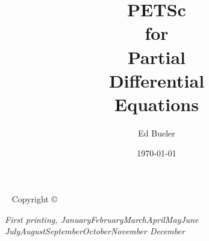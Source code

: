 \documentclass{tufte-book}
\title[PETSc for PDEs]{PETSc \\ for \\ Partial \\ Differential \\ Equations}
\author{Ed Bueler}
\date{\today}
\theoremstyle{definition}
\newcommand{\openepigraph}[2]{%
  \begin{fullwidth}
  \sffamily\large
  \begin{doublespace}
  \noindent\allcaps{#1}\\%
  \noindent \Large \allcaps{#2}%
  \end{doublespace}
  \end{fullwidth}
}
\newcommand{\monthyear}{%
  \ifcase\month\or January\or February\or March\or April\or May\or June\or
  July\or August\or September\or October\or November\or
  December\fi\space\number\year
}
\begin{document}
\begin{comment}
\newpage\thispagestyle{empty}
\openepigraph{%
\dots when there are disputes among persons, we can simply say: Let us calculate, without further ado, to see who is right.
}{Gottfried Wilhelm Leibniz}
\vfill
\openepigraph{%
Developing parallel, nontrivial PDE solvers that deliver high performance is still difficult and requires months (or even years) of concentrated effort.  PETSc is a toolkit that can ease these difficulties and reduce the development time, but it is not a black-box PDE solver, nor a silver bullet
}{Barry Smith}
\vfill
\openepigraph{%
Tufte's style is known for its extensive use of sidenotes, tight integration of graphics with text, and well-set typography.
}{The Tufte-LaTeX\ Developers}
\vfill

\frontmatter
\end{comment}

\maketitle


\newpage
\begin{fullwidth}
~\vfill
\thispagestyle{empty}
\setlength{\parindent}{0pt}
\setlength{\parskip}{\baselineskip}
Copyright \copyright\ \the\year\ \thanklessauthor

\par{}


\par\textit{First printing, \monthyear}
\end{fullwidth}

\tableofcontents






\mainmatter






\end{document}
